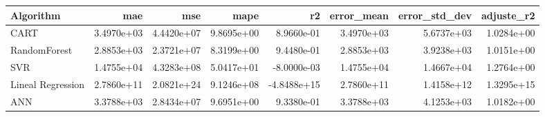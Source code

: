 \begin{tabular}{lrrrrrrr}
\toprule
Algorithm & mae & mse & mape & r2 & error_mean & error_std_dev & adjuste_r2 \\
\midrule
CART & 3.4970e+03 & 4.4420e+07 & 9.8695e+00 & 8.9660e-01 & 3.4970e+03 & 5.6737e+03 & 1.0284e+00 \\
RandomForest & 2.8853e+03 & 2.3721e+07 & 8.3199e+00 & 9.4480e-01 & 2.8853e+03 & 3.9238e+03 & 1.0151e+00 \\
SVR & 1.4755e+04 & 4.3283e+08 & 5.0417e+01 & -8.0000e-03 & 1.4755e+04 & 1.4667e+04 & 1.2764e+00 \\
Lineal Regression & 2.7860e+11 & 2.0821e+24 & 9.1246e+08 & -4.8488e+15 & 2.7860e+11 & 1.4158e+12 & 1.3295e+15 \\
ANN & 3.3788e+03 & 2.8434e+07 & 9.6951e+00 & 9.3380e-01 & 3.3788e+03 & 4.1253e+03 & 1.0182e+00 \\
\bottomrule
\end{tabular}
